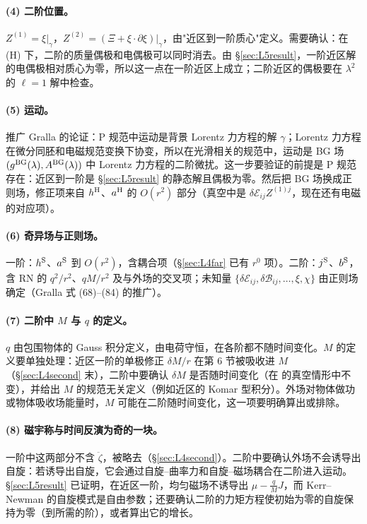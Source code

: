 \documentclass[11pt,a4paper]{ctexart}
\numberwithin{equation}{section}
\begin{document}
\paragraph{(4) 二阶位置。}$Z^{(1)}=\xi|_\gamma$，$Z^{(2)}=(\Xi+\xi\cdot\partial\xi)|_\gamma$，由"近区到一阶质心"定义。需要确认：在 (H) 下，二阶的质量偶极和电偶极可以同时消去。由 \S\ref{sec:L5result}，一阶近区解的电偶极相对质心为零，所以这一点在一阶近区上成立；二阶近区的偶极要在 $\lambda^2$ 的 $\ell=1$ 解中检查。

\paragraph{(5) 运动。}推广 Gralla 的论证：P 规范中运动是背景 Lorentz 力方程的解 $\gamma$；Lorentz 力方程在微分同胚和电磁规范变换下协变，所以在光滑相关的规范中，运动是 BG 场 $(g^{\rm BG}(\lambda),A^{\rm BG}(\lambda))$ 中 Lorentz 力方程的二阶微扰。这一步要验证的前提是 P 规范存在：近区到一阶是 \S\ref{sec:L5result} 的静态解且偶极为零。然后把 BG 场换成正则场，修正项来自 $h^{\rm H}$、$a^{\rm H}$ 的 $O(r^2)$ 部分（真空中是 $\delta\mathcal E_{ij}Z^{(1)j}$，现在还有电磁的对应项）。

\paragraph{(6) 奇异场与正则场。}一阶：$h^{\rm S}$、$a^{\rm S}$ 到 $O(r^2)$，含耦合项（\S\ref{sec:L4far} 已有 $r^0$ 项）。二阶：$j^{\rm S}$、$b^{\rm S}$，含 RN 的 $q^2/r^2$、$qM/r^2$ 及与外场的交叉项；未知量 $\{\delta\mathcal E_{ij},\delta\mathcal B_{ij},\dots,\xi,\chi\}$ 由正则场确定（Gralla 式 (68)--(84) 的推广）。

\paragraph{(7) 二阶中 $M$ 与 $q$ 的定义。}$q$ 由包围物体的 Gauss 积分定义，由电荷守恒，在各阶都不随时间变化。$M$ 的定义要单独处理：近区一阶的单极修正 $\delta M/r$ 在第 6 节被吸收进 $M$（\S\ref{sec:L4second} 末），二阶中要确认 $\delta M$ 是否随时间变化（在 \citet{GrallaWald2008} 的真空情形中不变），并给出 $M$ 的规范无关定义（例如近区的 Komar 型积分）。外场对物体做功或物体吸收场能量时，$M$ 可能在二阶随时间变化，这一项要明确算出或排除。

\paragraph{(8) 磁宇称与时间反演为奇的一块。}一阶中这两部分不含 $\ddot\zeta$，被略去（\S\ref{sec:L4second}）。二阶中要确认外场不会诱导出自旋：若诱导出自旋，它会通过自旋–曲率力和自旋–磁场耦合在二阶进入运动。\S\ref{sec:L5result} 已证明，在近区一阶，均匀磁场不诱导出 $\mu-\tfrac qMJ$，而 Kerr--Newman 的自旋模式是自由参数；还要确认二阶的力矩方程使初始为零的自旋保持为零（到所需的阶），或者算出它的增长。
\end{document}
